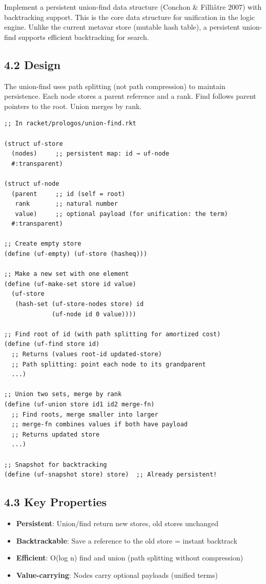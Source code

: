 \documentclass[11pt]{article}
\begin{document}
Implement a persistent union-find data structure (Conchon \& Filliâtre 2007)
with backtracking support. This is the core data structure for unification
in the logic engine. Unlike the current metavar store (mutable hash table),
a persistent union-find supports efficient backtracking for search.
\subsection{4.2 Design}
\label{sec:org000e113}

The union-find uses path splitting (not path compression) to maintain
persistence. Each node stores a parent reference and a rank. Find follows
parent pointers to the root. Union merges by rank.

\begin{verbatim}
;; In racket/prologos/union-find.rkt

(struct uf-store
  (nodes)     ;; persistent map: id → uf-node
  #:transparent)

(struct uf-node
  (parent     ;; id (self = root)
   rank       ;; natural number
   value)     ;; optional payload (for unification: the term)
  #:transparent)

;; Create empty store
(define (uf-empty) (uf-store (hasheq)))

;; Make a new set with one element
(define (uf-make-set store id value)
  (uf-store
   (hash-set (uf-store-nodes store) id
             (uf-node id 0 value))))

;; Find root of id (with path splitting for amortized cost)
(define (uf-find store id)
  ;; Returns (values root-id updated-store)
  ;; Path splitting: point each node to its grandparent
  ...)

;; Union two sets, merge by rank
(define (uf-union store id1 id2 merge-fn)
  ;; Find roots, merge smaller into larger
  ;; merge-fn combines values if both have payload
  ;; Returns updated store
  ...)

;; Snapshot for backtracking
(define (uf-snapshot store) store)  ;; Already persistent!
\end{verbatim}
\subsection{4.3 Key Properties}
\label{sec:orgbd18300}

\begin{itemize}
\item \textbf{Persistent}: Union/find return new stores, old stores unchanged
\item \textbf{Backtrackable}: Save a reference to the old store = instant backtrack
\item \textbf{Efficient}: O(log n) find and union (path splitting without compression)
\item \textbf{Value-carrying}: Nodes carry optional payloads (unified terms)
\end{itemize}
\end{document}
